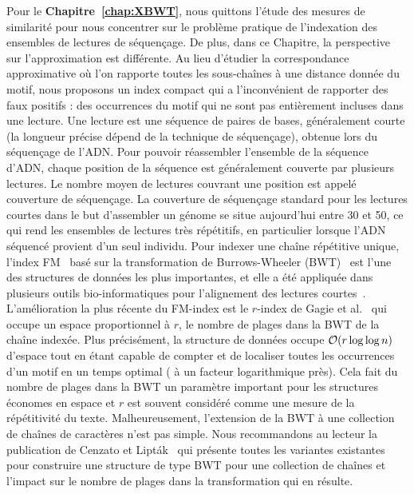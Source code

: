 Pour le \textbf{Chapitre~\ref{chap:XBWT}}, nous quittons l'étude des mesures de similarité pour nous concentrer sur le problème pratique de l'indexation des ensembles de lectures de séquençage. 
De plus, dans ce Chapitre, la perspective sur l'approximation est différente. Au lieu d'étudier la correspondance approximative où l'on rapporte toutes les sous-chaînes à une distance donnée du motif, nous proposons un index compact qui a l'inconvénient de rapporter des faux positifs : des occurrences du motif qui ne sont pas entièrement incluses dans une lecture.
%
Une lecture est une séquence de paires de bases, généralement courte (la longueur précise dépend de la technique de séquençage), obtenue lors du séquençage de l'ADN. Pour pouvoir réassembler l'ensemble de la séquence d'ADN, chaque position de la séquence est généralement couverte par plusieurs lectures. Le nombre moyen de lectures couvrant une position est appelé couverture de séquençage.
La couverture de séquençage standard pour les lectures courtes dans le but d'assembler un génome se situe aujourd'hui entre 30 et 50, ce qui rend les ensembles de lectures très répétitifs, en particulier lorsque l'ADN séquencé provient d'un seul individu.
%
Pour indexer une chaîne répétitive unique, l'index FM~\cite{ferragina2005indexing} basé sur la transformation de Burrows-Wheeler (BWT)~\cite{burrows1994block} est l'une des structures de données les plus importantes, et elle a été appliquée dans plusieurs outils bio-informatiques pour l'alignement des lectures courtes~\cite{langmead2009ultrafast,langmead2012fast,li2009fast}.
%
L'amélioration la plus récente du FM-index est le $r$-index de Gagie et al.~\cite{gagie2020fully} qui occupe un espace proportionnel à $r$, le nombre de plages dans la BWT de la chaîne indexée. Plus précisément, la structure de données occupe $\mathcal{O}(r\log\log n)$ d'espace tout en étant capable de compter et de localiser toutes les occurrences d'un motif en un temps optimal ( à un facteur logarithmique près). Cela fait du nombre de plages dans la BWT un paramètre important pour les structures économes en espace et $r$ est souvent considéré comme une mesure de la répétitivité du texte.
%
Malheureusement, l'extension de la BWT à une collection de chaînes de caractères n'est pas simple. Nous recommandons au lecteur la publication de Cenzato et Lipták~\cite{cenzato_et_al_BWT_Collections} qui présente toutes les variantes existantes pour construire une structure de type BWT pour une collection de chaînes et l'impact sur le nombre de plages dans la transformation qui en résulte.

